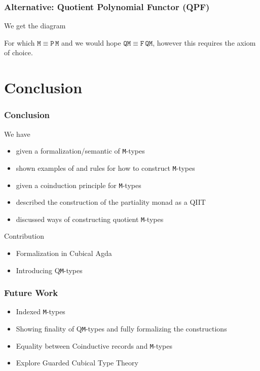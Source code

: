 \documentclass[xelatex,mathserif,serif,notheorems]{beamer} %
\theoremstyle{plain} %
\theoremstyle{definition}
\theoremstyle{remark}
\newcommand*{\type}[1]{\textcolor{magenta!90!black}{#1}}
\newcommand*{\unit}{\type{\textbf{1}}}
\newcommand*{\function}[1]{\textcolor{blue!60!black}{\ensuremath{\mathtt{#1}}}}
\newcommand*{\typeformer}[1]{\ensuremath{\mathtt{#1}}}
\newcommand*{\functor}[1]{\ensuremath{\mathbf{\mathtt{#1}}}}
\begin{document}
\begin{frame}[fragile]
  \frametitle{Alternative: Quotient Polynomial Functor (QPF)}
  We get the diagram
  \begin{figure}
    \centering
  \end{figure}
  For which \(\typeformer{M} \equiv \functor{P}\,\typeformer{M}\) and we would hope \(\typeformer{QM} \equiv \functor{F}\,\typeformer{QM}\), however this requires the axiom of choice.
\end{frame}

\section{Conclusion}
\begin{frame}
  \frametitle{Conclusion}
  We have
  \begin{itemize}
  \item given a formalization/semantic of \texttt{M}-types %
  \item shown examples of and rules for how to construct \texttt{M}-types
  \item given a coinduction principle for \texttt{M}-types
  \item described the construction of the partiality monad as a QIIT
  \item discussed ways of constructing quotient \texttt{M}-types
  \end{itemize}
  Contribution
  \begin{itemize}
  \item Formalization in Cubical Agda
  \item Introducing Q\texttt{M}-types
  \end{itemize}
\end{frame}

\begin{frame}
  \frametitle{Future Work}
  \begin{itemize}
  \item Indexed \texttt{M}-types
  \item Showing finality of Q\texttt{M}-types and fully formalizing the constructions %
  \item Equality between Coinductive records and \texttt{M}-types
  \item Explore Guarded Cubical Type Theory
  \end{itemize}
\end{frame}
\end{document}
